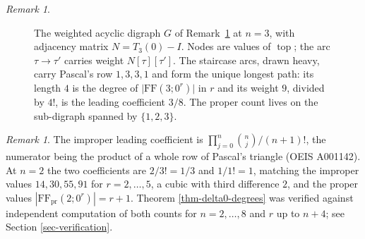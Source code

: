 \documentclass[11pt, a4paper, abstract=yes]{scrartcl}
\theoremstyle{definition}
\theoremstyle{remark}
\newtheorem{remark}[definition]{Remark}
\theoremstyle{plain}
\newcommand{\tp}{\operatorname{top}}
\begin{document}
\begin{remark}
\begin{figure}[htbp]
\centering
{}
\caption{The weighted acyclic digraph \(G\) of Remark~\ref{rem-delta0-digraph} at \(n=3\), with
adjacency matrix \(N=T_3(0)-I\). Nodes are values of \(\tp\); the arc \(\tau\to\tau'\) carries
weight \(N[\tau][\tau']\). The staircase arcs, drawn heavy, carry Pascal's row \(1,3,3,1\) and
form the unique longest path: its length \(4\) is the degree of
\(\lvert\mathrm{FF}(3;0^r)\rvert\) in \(r\) and its weight \(9\), divided by \(4!\), is the
leading coefficient \(3/8\). The proper count lives on the sub-digraph spanned by
\(\lbrace1,2,3\rbrace\).}
\label{fig:delta0-digraph}
\end{figure}
\label{rem-delta0-digraph}
\end{remark}

\begin{remark}
The improper leading coefficient is \(\prod_{j=0}^{n}\binom nj\big/(n+1)!\), the numerator being the
product of a whole row of Pascal's triangle (OEIS A001142). At \(n=2\) the two coefficients are
\(2/3!=1/3\) and \(1/1!=1\), matching the improper values \(14,30,55,91\) for \(r=2,\dots,5\), a
cubic with third difference \(2\), and the proper values
\(|\mathrm{FF}_{\mathrm{pr}}(2;0^r)|=r+1\). Theorem \ref{thm-delta0-degrees} was verified against
independent computation of both counts for \(n=2,\dots,8\) and \(r\) up to \(n+4\); see
Section \ref{sec-verification}.
\label{rem-delta0-degrees}
\end{remark}
\end{document}
